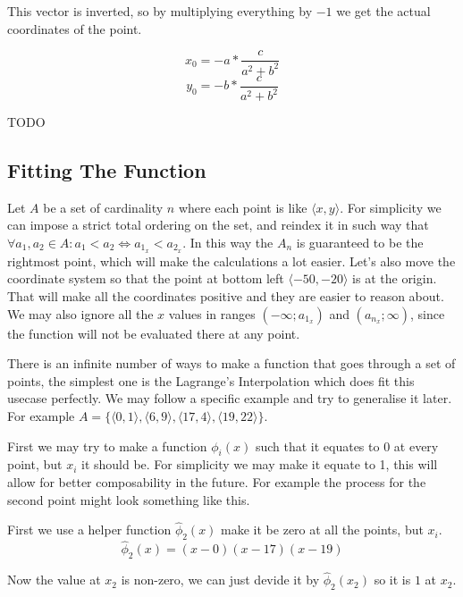 \documentclass[12pt, titlepage]{article}
\newcommand{\TODO}{\begin{center}\color{red}TODO\end{center}}
\begin{document}
This vector is inverted, so by multiplying everything by $-1$ we get the actual 
coordinates of the point.

\begin{equation}
    x_0 = -a * \frac{c}{a^2 + b^2}
\end{equation}
\begin{equation}
    y_0 = -b * \frac{c}{a^2 + b^2}
\end{equation}

\TODO

\subsection{Fitting The Function}
Let $A$ be a set of cardinality $n$ where each point is like $\langle x, y \rangle$.
For simplicity we can impose a strict total ordering on the set, and reindex
it in such way that $\forall a_1,a_2 \in A : a_1 < a_2 \Leftrightarrow a_{1_x} < 
a_{2_x}$. In this way the $A_n$ is guaranteed to be the rightmost point, which
will make the calculations a lot easier. Let's also move the coordinate system
so that the point at bottom left $\langle -50, -20 \rangle$ is at the origin.
That will make all the coordinates positive and they are easier to reason about.
We may also ignore all the $x$ values in ranges 
$(-\infty; a_{1_x})$ and $(a_{n_x}; \infty)$, since the function will not be 
evaluated there at any point.

There is an infinite number of ways to make a function that goes through a set of
points, the simplest one is the Lagrange's Interpolation which does fit this 
usecase perfectly. We may follow a specific example and try to generalise it later. 
For example $A = \{\langle 0, 1 \rangle, \langle 6, 9 \rangle, 
\langle 17, 4 \rangle, \langle 19, 22 \rangle\}$.

First we may try to make a function $\phi_i(x)$ such that it equates to 0 at
every point, but $x_i$ it should be. For simplicity we may make it equate to 1, this will
allow for better composability in the future. For example the process for the second point
might look something like this.

First we use a helper function $\hat{\phi}_2(x)$ make it be zero at all the points, but $x_i$.
\begin{equation}
    \hat{\phi}_2(x) = (x - 0)(x - 17)(x - 19)
\end{equation}

Now the value at $x_2$ is non-zero, we can just devide it by $\hat{\phi}_2(x_2)$ 
so it is $1$ at $x_2$.
\end{document}
